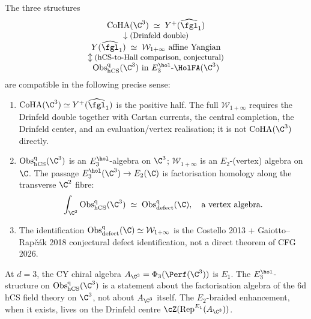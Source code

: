 \begin{theorem}
\label{thm:cross-consistency-avatar}
The three structures
\[
\begin{array}{c}
\mathrm{CoHA}(\C^3) \;\simeq\; Y^+(\widehat{\fgl}_1) \\
\downarrow \text{\small(Drinfeld double)} \\
Y(\widehat{\fgl}_1) \;\simeq\; \mathcal{W}_{1+\infty} \text{ affine Yangian} \\
\updownarrow \text{\small(hCS-to-Hall comparison, conjectural)} \\
\mathrm{Obs}^{\mathrm{q}}_{\hCS}(\C^3) \text{ in } E_3^{\hol}\text{-}\HolFA(\C^3)
\end{array}
\]
are compatible in the following precise sense:
\begin{enumerate}
\item $\mathrm{CoHA}(\C^3) \simeq Y^+(\widehat{\fgl}_1)$ is the positive half.  The full $\mathcal{W}_{1+\infty}$ requires the Drinfeld double together with Cartan currents, the central completion, the Drinfeld center, and an evaluation/vertex realisation; it is not $\mathrm{CoHA}(\C^3)$ directly.
\item $\mathrm{Obs}^{\mathrm{q}}_{\hCS}(\C^3)$ is an $E_3^{\hol}$-algebra on $\C^3$; $\mathcal{W}_{1+\infty}$ is an $E_2$-(vertex) algebra on $\C$. The passage $E_3^{\hol}(\C^3) \to E_2(\C)$ is factorisation homology along the transverse $\C^2$ fibre:
\[
\int_{\C^2} \mathrm{Obs}^{\mathrm{q}}_{\hCS}(\C^3) \;\simeq\; \mathrm{Obs}^{\mathrm{q}}_{\mathrm{defect}}(\C), \quad \text{a vertex algebra.}
\]
\item The identification $\mathrm{Obs}^{\mathrm{q}}_{\mathrm{defect}}(\C) \simeq \mathcal{W}_{1+\infty}$ is the Costello 2013 + Gaiotto--Rap\v{c}\'ak 2018 conjectural defect identification, not a direct theorem of CFG 2026.
\end{enumerate}
\end{theorem}

\begin{remark}
\label{rem:d3-operadic-boundary-avatar}
At $d = 3$, the CY chiral algebra
$A_{\C^3}=\Phi_3(\Perf(\C^3))$ is $E_1$. The
$E_3^{\hol}$-structure on
$\mathrm{Obs}^{\mathrm{q}}_{\hCS}(\C^3)$ is a statement about the
factorisation algebra of the 6d hCS field theory on $\C^3$, not about
$A_{\C^3}$ itself. The $E_2$-braided enhancement, when it exists, lives
on the Drinfeld centre
$\cZ(\mathrm{Rep}^{E_1}(A_{\C^3}))$.
\end{remark}
